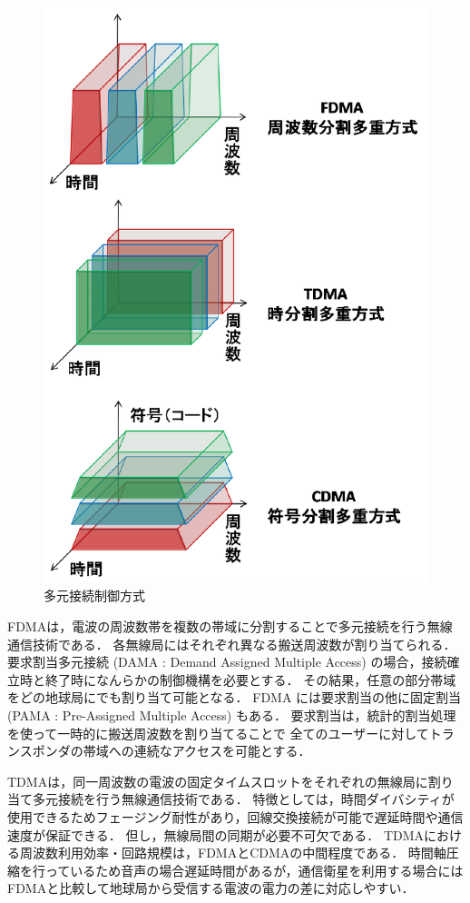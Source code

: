 \documentclass[12pt]{jreport}
\begin{document}
\begin{figure}[bt]
 \centering
 \includegraphics[width=0.8\columnwidth]{figure/multiple_access.pdf}
 \caption{多元接続制御方式}
 \label{fig:multiple_access}
\end{figure}

FDMAは，電波の周波数帯を複数の帯域に分割することで多元接続を行う無線通信技術である．
各無線局にはそれぞれ異なる搬送周波数が割り当てられる．
要求割当多元接続 (DAMA : Demand Assigned Multiple Access) の場合，接続確立時と終了時になんらかの制御機構を必要とする．
その結果，任意の部分帯域をどの地球局にでも割り当て可能となる．
FDMA には要求割当の他に固定割当 (PAMA : Pre-Assigned Multiple Access) もある．
要求割当は，統計的割当処理を使って一時的に搬送周波数を割り当てることで
全てのユーザーに対してトランスポンダの帯域への連続なアクセスを可能とする．

TDMAは，同一周波数の電波の固定タイムスロットをそれぞれの無線局に割り当て多元接続を行う無線通信技術である．
特徴としては，時間ダイバシティが使用できるためフェージング耐性があり，回線交換接続が可能で遅延時間や通信速度が保証できる．
但し，無線局間の同期が必要不可欠である．
TDMAにおける周波数利用効率・回路規模は，FDMAとCDMAの中間程度である．
時間軸圧縮を行っているため音声の場合遅延時間があるが，通信衛星を利用する場合には
FDMAと比較して地球局から受信する電波の電力の差に対応しやすい．
\end{document}
